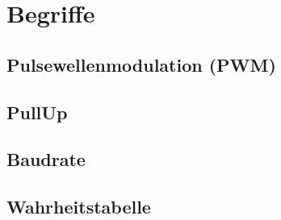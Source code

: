 \section{Begriffe}
\label{sec:begriffe}

\subsection{Pulsewellenmodulation (PWM)}
\label{subsec:pulsewellenmodulation-(pwm)}

\subsection{PullUp}
\label{subsec:pullup}

\subsection{Baudrate}
\label{subsec:baudrate}

\subsection{Wahrheitstabelle}
\label{subsec:wahrheitstabelle}

